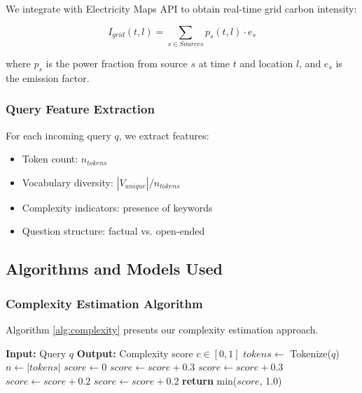 \documentclass[conference]{IEEEtran}
\begin{document}
We integrate with Electricity Maps API to obtain real-time grid carbon intensity:

\begin{equation}
I_{grid}(t, l) = \sum_{s \in Sources} p_s(t, l) \cdot e_s
\end{equation}

where $p_s$ is the power fraction from source $s$ at time $t$ and location $l$, and $e_s$ is the emission factor.

\subsubsection{Query Feature Extraction}

For each incoming query $q$, we extract features:

\begin{itemize}
    \item Token count: $n_{tokens}$
    \item Vocabulary diversity: $|V_{unique}| / n_{tokens}$
    \item Complexity indicators: presence of keywords
    \item Question structure: factual vs. open-ended
\end{itemize}

\subsection{Algorithms and Models Used}

\subsubsection{Complexity Estimation Algorithm}

Algorithm \ref{alg:complexity} presents our complexity estimation approach.

\begin{algorithm}[h]
\caption{Query Complexity Estimation}
\label{alg:complexity}
\begin{algorithmic}[1]
\STATE \textbf{Input:} Query $q$
\STATE \textbf{Output:} Complexity score $c \in [0, 1]$
\STATE $tokens \leftarrow$ Tokenize($q$)
\STATE $n \leftarrow |tokens|$
\STATE $score \leftarrow 0$
    \STATE $score \leftarrow score + 0.3$
\ENDIF
{}
    \STATE $score \leftarrow score + 0.3$
\ENDIF
{}
    \STATE $score \leftarrow score + 0.2$
\ENDIF
{}
    \STATE $score \leftarrow score + 0.2$
\ENDIF
\STATE \textbf{return} min($score$, 1.0)
\end{algorithmic}
\end{algorithm}
\end{document}

